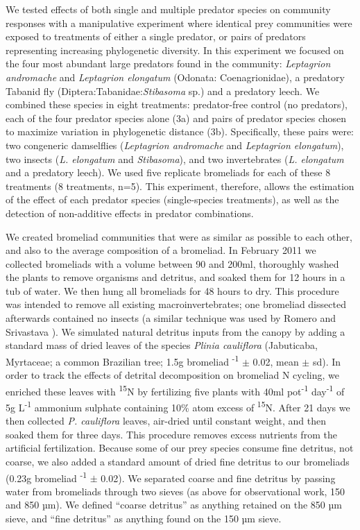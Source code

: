 We tested effects of both single and multiple predator species on
community responses with a manipulative experiment where identical prey
communities were exposed to treatments of either a single predator, or
pairs of predators representing increasing phylogenetic diversity. In
this experiment we focused on the four most abundant large predators
found in the community: \emph{Leptagrion andromache} and
\emph{Leptagrion elongatum} (Odonata: Coenagrionidae), a predatory
Tabanid fly (Diptera:Tabanidae:\emph{Stibasoma} sp.) and a predatory
leech. We combined these species in eight treatments: predator-free
control (no predators), each of the four predator species alone (3a) and
pairs of predator species chosen to maximize variation in phylogenetic
distance (3b). Specifically, these pairs were: two congeneric
damselflies (\emph{Leptagrion andromache} and \emph{Leptagrion
elongatum}), two insects (\emph{L. elongatum} and \emph{Stibasoma}), and
two invertebrates (\emph{L. elongatum} and a predatory leech). We used
five replicate bromeliads for each of these 8 treatments (8 treatments,
n=5). This experiment, therefore, allows the estimation of the effect of
each predator species (single-species treatments), as well as the
detection of non-additive effects in predator combinations.

We created bromeliad communities that were as similar as possible to
each other, and also to the average composition of a bromeliad. In
February 2011 we collected bromeliads with a volume between 90 and
200ml, thoroughly washed the plants to remove organisms and detritus,
and soaked them for 12 hours in a tub of water. We then hung all
bromeliads for 48 hours to dry. This procedure was intended to remove
all existing macroinvertebrates; one bromeliad dissected afterwards
contained no insects (a similar technique was used by Romero and
Srivastava \citeyearpar{Romero2010}). We simulated natural detritus
inputs from the canopy by adding a standard mass of dried leaves of the
species \emph{Plinia cauliflora} (Jabuticaba, Myrtaceae; a common
Brazilian tree; 1.5g bromeliad \textsuperscript{-1} $\pm$ 0.02, mean $\pm$ sd).
In order to track the effects of detrital decomposition on bromeliad N
cycling, we enriched these leaves with \textsuperscript{15}N by
fertilizing five plants with 40ml pot\textsuperscript{-1}
day\textsuperscript{-1} of 5g L\textsuperscript{-1} ammonium sulphate
containing 10\% atom excess of \textsuperscript{15}N. After 21 days we
then collected \emph{P. cauliflora} leaves, air-dried until constant
weight, and then soaked them for three days. This procedure removes
excess nutrients from the artificial fertilization. Because some of our
prey species consume fine detritus, not coarse, we also added a standard
amount of dried fine detritus to our bromeliads (0.23g bromeliad
\textsuperscript{-1} $\pm$ 0.02). We separated coarse and fine detritus by
passing water from bromeliads through two sieves (as above for
observational work, 150 and 850 µm). We defined ``coarse detritus'' as
anything retained on the 850 µm sieve, and ``fine detritus'' as anything
found on the 150 µm sieve.

